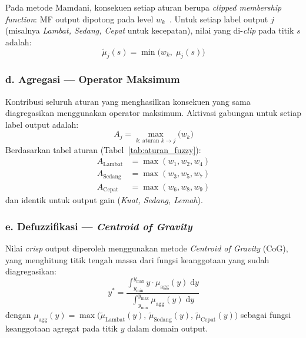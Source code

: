 Pada metode Mamdani, konsekuen setiap aturan berupa \textit{clipped membership function}: MF output dipotong pada level $w_k$~\cite{Mamdani1974}. Untuk setiap label output $j$ (misalnya \textit{Lambat, Sedang, Cepat} untuk kecepatan), nilai yang di-\textit{clip} pada titik $s$ adalah:
\begin{equation}
    \tilde{\mu}_j(s) = \min \!\bigl(w_k,\; \mu_j(s)\bigr)
    \label{eq:mamdani_clip}
\end{equation}

\subsubsection*{d. Agregasi --- Operator Maksimum}

Kontribusi seluruh aturan yang menghasilkan konsekuen yang sama diagregasikan menggunakan operator maksimum. Aktivasi gabungan untuk setiap label output adalah:
\begin{equation}
    A_j = \max_{k:\,\text{aturan } k \to j}\!\bigl(w_k\bigr)
    \label{eq:aggregation}
\end{equation}
Berdasarkan tabel aturan (Tabel~\ref{tab:aturan_fuzzy}):
\begin{align}
    A_\text{Lambat} &= \max(w_1, w_2, w_4) \label{eq:agg_lambat} \\
    A_\text{Sedang} &= \max(w_3, w_5, w_7) \label{eq:agg_sedang} \\
    A_\text{Cepat}  &= \max(w_6, w_8, w_9) \label{eq:agg_cepat}
\end{align}
dan identik untuk output gain (\textit{Kuat, Sedang, Lemah}).

\subsubsection*{e. Defuzzifikasi --- \textit{Centroid of Gravity}}

Nilai \textit{crisp} output diperoleh menggunakan metode \textit{Centroid of Gravity} (CoG), yang menghitung titik tengah massa dari fungsi keanggotaan yang sudah diagregasikan:
\begin{equation}
    y^* = \frac{\displaystyle\int_{y_\text{min}}^{y_\text{max}}
          y\cdot\mu_\text{agg}(y)\;\mathrm{d}y}
         {\displaystyle\int_{y_\text{min}}^{y_\text{max}}
          \mu_\text{agg}(y)\;\mathrm{d}y}
    \label{eq:defuzz_cog}
\end{equation}
dengan $\mu_\text{agg}(y) = \max\!\bigl(\tilde{\mu}_\text{Lambat}(y),\,
\tilde{\mu}_\text{Sedang}(y),\, \tilde{\mu}_\text{Cepat}(y)\bigr)$ sebagai fungsi keanggotaan agregat pada titik $y$ dalam domain output.

